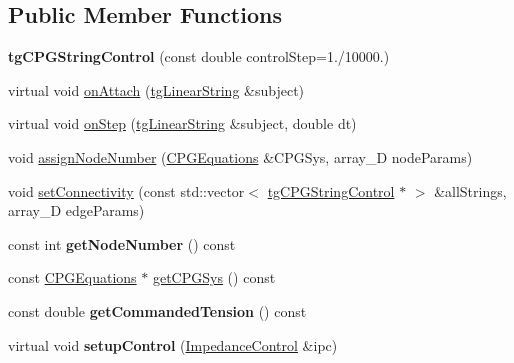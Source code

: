 \subsection*{Public Member Functions}
\begin{DoxyCompactItemize}
\item 
\hypertarget{classtg_c_p_g_string_control_ae8704aebd96632466b5e3743d8d59446}{{\bfseries tg\-C\-P\-G\-String\-Control} (const double control\-Step=1./10000.)}\label{classtg_c_p_g_string_control_ae8704aebd96632466b5e3743d8d59446}

\item 
virtual void \hyperlink{classtg_c_p_g_string_control_abc4e5f2a73920cd4aed294f080bdee25}{on\-Attach} (\hyperlink{classtg_linear_string}{tg\-Linear\-String} \&subject)
\item 
virtual void \hyperlink{classtg_c_p_g_string_control_a86ba4af920798c9f6cda4bbc5b1880e0}{on\-Step} (\hyperlink{classtg_linear_string}{tg\-Linear\-String} \&subject, double dt)
\item 
void \hyperlink{classtg_c_p_g_string_control_afee54d927062c0c16863ff19a4dc4dc2}{assign\-Node\-Number} (\hyperlink{class_c_p_g_equations}{C\-P\-G\-Equations} \&C\-P\-G\-Sys, array\-\_\-D node\-Params)
\item 
void \hyperlink{classtg_c_p_g_string_control_a1df89c0bb265cfc32135ba85328cb15f}{set\-Connectivity} (const std\-::vector$<$ \hyperlink{classtg_c_p_g_string_control}{tg\-C\-P\-G\-String\-Control} $\ast$ $>$ \&all\-Strings, array\-\_\-D edge\-Params)
\item 
\hypertarget{classtg_c_p_g_string_control_a6d4ea373d10945042709cbb617fcf94f}{const int {\bfseries get\-Node\-Number} () const }\label{classtg_c_p_g_string_control_a6d4ea373d10945042709cbb617fcf94f}

\item 
const \hyperlink{class_c_p_g_equations}{C\-P\-G\-Equations} $\ast$ \hyperlink{classtg_c_p_g_string_control_ad53c67b99b6e32f930767de9f4c680c5}{get\-C\-P\-G\-Sys} () const 
\item 
\hypertarget{classtg_c_p_g_string_control_a0267c50890b1c53619e75aac6c2bbadd}{const double {\bfseries get\-Commanded\-Tension} () const }\label{classtg_c_p_g_string_control_a0267c50890b1c53619e75aac6c2bbadd}

\item 
\hypertarget{classtg_c_p_g_string_control_a5bf46bd7c388266022db06cde01e6dbb}{virtual void {\bfseries setup\-Control} (\hyperlink{class_impedance_control}{Impedance\-Control} \&ipc)}\label{classtg_c_p_g_string_control_a5bf46bd7c388266022db06cde01e6dbb}


\end{DoxyCompactItemize}
